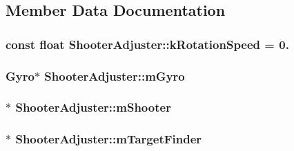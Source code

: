 \subsection{\-Member \-Data \-Documentation}
\hypertarget{class_shooter_adjuster_a2c3cb7c557b0db61576a5948227b8c42}{
\subsubsection[{k\-Rotation\-Speed}]{\setlength{\rightskip}{0pt plus 5cm}const float {\bf \-Shooter\-Adjuster\-::k\-Rotation\-Speed} = 0.}}\label{class_shooter_adjuster_a2c3cb7c557b0db61576a5948227b8c42}
\hypertarget{class_shooter_adjuster_ad0c5d105a2c182e2e502e8ef8e9452e9}{
\subsubsection[{m\-Gyro}]{\setlength{\rightskip}{0pt plus 5cm}\-Gyro$\ast$ {\bf \-Shooter\-Adjuster\-::m\-Gyro}}}\label{class_shooter_adjuster_ad0c5d105a2c182e2e502e8ef8e9452e9}
\hypertarget{class_shooter_adjuster_a4e7a220158bd064180b2b1aa9d1ac614}{
\subsubsection[{m\-Shooter}]{$\ast$ {\bf \-Shooter\-Adjuster\-::m\-Shooter}}}\label{class_shooter_adjuster_a4e7a220158bd064180b2b1aa9d1ac614}
\hypertarget{class_shooter_adjuster_aada6daf6f361af84d6ccb6a416215866}{
\subsubsection[{m\-Target\-Finder}]{$\ast$ {\bf \-Shooter\-Adjuster\-::m\-Target\-Finder}}}\label{class_shooter_adjuster_aada6daf6f361af84d6ccb6a416215866}

